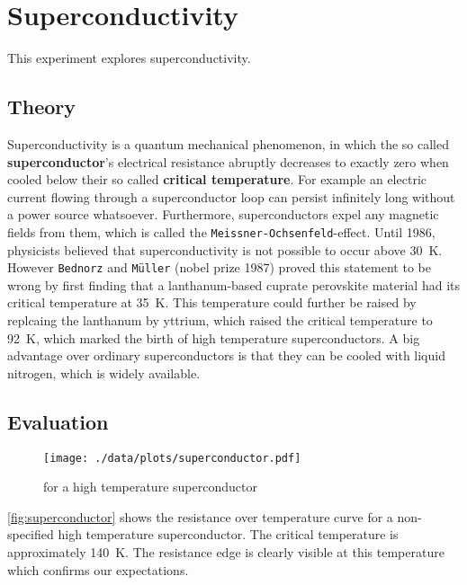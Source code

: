 \chapter{Superconductivity}
This experiment explores superconductivity.

\section{Theory}
Superconductivity is a quantum mechanical phenomenon, in which the so called \textbf{superconductor}'s electrical resistance abruptly decreases to exactly zero when cooled below their so called \textbf{critical temperature}.
For example an electric current flowing through a superconductor loop can persist infinitely long without a power source whatsoever.
Furthermore, superconductors expel any magnetic fields from them, which is called the \texttt{Meissner-Ochsenfeld}-effect.
Until 1986, physicists believed that superconductivity is not possible to occur above \SI{30}{\kelvin}.
However \texttt{Bednorz} and \texttt{Müller} (nobel prize 1987) proved this statement to be wrong by first finding that a lanthanum-based cuprate perovskite material had its critical temperature at \SI{35}{\kelvin}.
This temperature could further be raised by replcaing the lanthanum by yttrium, which raised the critical temperature to \SI{92}{\kelvin}\cite{PhysRevLett.58.908}, which marked the birth of high temperature superconductors.
A big advantage over ordinary superconductors is that they can be cooled with liquid nitrogen, which is widely available.

\section{Evaluation}
\begin{figure}[tbp]
	\centering
	\texttt{[image: ./data/plots/superconductor.pdf]}
	\caption[Superconductivity: Resistance over temperature]{ for a high temperature superconductor}
	\label{fig:superconductor}
\end{figure}
\autoref{fig:superconductor} shows the resistance over temperature curve for a non-specified high temperature superconductor.
The critical temperature is approximately \SI{140}{\kelvin}.
The resistance edge is clearly visible at this temperature which confirms our expectations.
